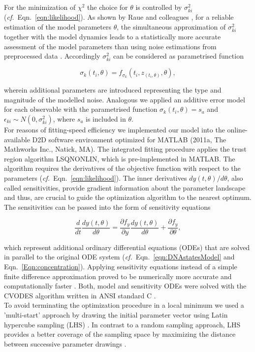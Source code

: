 For the minimization of $\chi^{2}$ the choice for $\theta$ is controlled by $\sigma_{ki}^2$ (\textit{cf.}\ Eqn.\ \ref{eqn:likelihood}). As shown by Raue and colleagues \cite{Raue2013}, for a reliable estimation of the model parameters $\theta$, the simultaneous approximation of $\sigma_{ki}^2$ together with the model dynamics leads to a statistically more accurate assessment of the model parameters than using noise estimations from preprocessed data \cite{Raue2013}. Accordingly $\sigma_{ki}^2$ can be considered as parametrised function

\begin{equation}
\sigma_{k}(t_i,\theta) = f_{\sigma_{k}}(t_i,z_(t_i,\theta),\theta),
\end{equation}    

wherein additional parameters are introduced representing the type and magnitude of the modelled noise. Analogous we applied an additive error model for each observable with the parametrised function $\sigma_{k}(t_i,\theta) = s_a$ and $\epsilon_{ki} \sim N(0,\sigma_{ki}^2)$, where $s_a$ is included in $\theta$.\\ 
For reasons of fitting-speed efficiency we implemented our model into the online-available D2D software environment \cite{Raue2013} optimized for MATLAB (2011a, The Mathworks Inc., Natick, MA). The integrated fitting procedure applies the trust region algorithm LSQNONLIN, which is pre-implemented in MATLAB. The algorithm requires the derivatives of the objective function with respect to the parameters (\textit{cf.}\ Eqn.\ \ref{eqn:likelihood}). The inner derivatives $dy(t,\theta)/d\theta$, also called sensitivities, provide gradient information about the parameter landscape and thus, are crucial to guide the optimization algorithm to the nearest optimum. The sensitivities can be passed into the form of sensitivity equations 

\begin{equation}
	\frac{d}{dt}\frac{dy(t,\theta)}{d\theta} = \frac{\partial f_y}{\partial y}\frac{dy(t,\theta)}{d\theta}+\frac{\partial f_y}{\partial \theta},
\end{equation}  

which represent additional ordinary differential equations (ODEs) \label{sec:ODE} that are solved in parallel to the original ODE system (\textit{cf.}\ Eqn.\ \ref{eqn:DNAstatesModel} and Eqn.\ \ref{Eqn:concentration})\cite{Leis1988}. Applying sensitivity equations instead of a simple finite difference approximation proved to be numerically more accurate and computationally faster \cite{Raue2013}. Both, model and sensitivity ODEs were solved with the CVODES algorithm written in ANSI \label{sec:ANSI} standard C \cite{Hindmarsh2005}. \\
To avoid terminating the optimization procedure in a local minimum we used a 'multi-start' approach by drawing the initial parameter vector using Latin hypercube sampling (LHS) \cite{Owen2014}. In contrast to a random sampling approach, LHS provides a better coverage of the sampling space by maximizing the distance between successive parameter drawings \cite{Raue2013}.    

